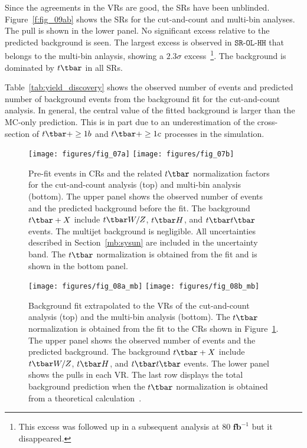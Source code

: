 Since the agreements in the VRs are good, the SRs have been unblinded.
Figure~\ref{f:fig_09ab} shows the SRs for the cut-and-count and multi-bin
analyses. The pull is shown in the lower panel. No significant excess relative
to the predicted background is seen. The largest excess is observed in
$\texttt{SR-OL-HH}$ that belongs to the multi-bin anlaysis, showing a
$2.3\sigma$ excess~\footnote{This excess was followed up in a subsequent
analysis at $80\textbf{ fb}^{-1}$ but it disappeared.}. The background is
dominated by $t\tbar$ in all SRs.

Table~\ref{tab:yield_discovery} shows the observed number of events and
predicted number of background events from the background fit for the
cut-and-count analysis. In general, the central value of the fitted background
is larger than the MC-only prediction. This is in part due to an
underestimation of the cross-section of $t\tbar+ \geq 1b$ and $t\tbar+ \geq 1c$
processes in the simulation.

\begin{figure}[H]
	\texttt{[image: figures/fig\_07a]}
	\texttt{[image: figures/fig\_07b]}
	\centering

	\caption{Pre-fit events in CRs and the related $t\tbar$ normalization factors
		for the cut-and-count analysis (top) and multi-bin analysis (bottom). The
		upper panel shows the observed number of events and the predicted background
		before the fit. The background $t\tbar+X$ include $t\tbar W/Z$, $t\tbar H$,
		and $t\tbar t\tbar$ events. The multijet background is negligible. All
		uncertainties described in Section~\ref{mb:sysun} are included in the
		uncertainty band. The $t\tbar$ normalization is obtained from the fit and is
		shown in the bottom panel.}

	\label{f:fig_07ab}
\end{figure}



\begin{figure}[H]
	\texttt{[image: figures/fig\_08a\_mb]}
	\texttt{[image: figures/fig\_08b\_mb]}
	\centering

	\caption{Background fit extrapolated to the VRs of the cut-and-count analysis
		(top) and the multi-bin analysis (bottom). The $t\tbar$ normalization is
		obtained from the fit to the CRs shown in Figure~\ref{f:fig_07ab}. The upper
		panel shows the observed number of events and the predicted background. The
		background $t\tbar+X$ include $t\tbar W/Z$, $t\tbar H$, and $t\tbar t\tbar$
		events. The lower panel shows the pulls in each VR. The last row displays the
		total background prediction when the $t\tbar$ normalization is obtained from a
		theoretical calculation~\cite{Czakon:2011xx}.}

	\label{f:fig_08ab}
\end{figure}

